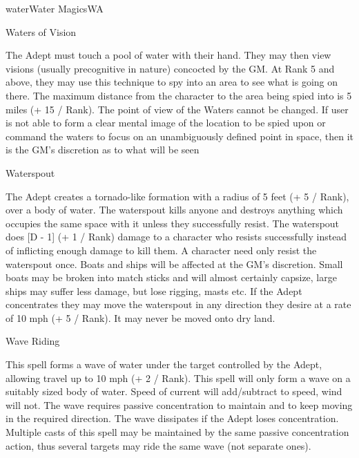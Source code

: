 \begin{college}[1.3]{water}{Water Magics}{WA}
\begin{spell}[S-13]{Waters of Vision}
\begin{effects}
The Adept must touch a pool of water with their hand. They may then
view visions (usually precognitive in nature) concocted by the GM. At
Rank 5 and above, they may use this technique to spy into an area to
see what is going on there. The maximum distance from the character to
the area being spied into is 5 miles (+ 15 / Rank). The point of view of
the Waters cannot be changed. If user is not able to form a clear
mental image of the location to be spied upon or command the waters to
focus on an unambiguously defined point in space, then it is the GM's
discretion as to what will be seen
\end{effects}
\end{spell}

\begin{spell}[S-14]{Waterspout}

\begin{effects}
The Adept creates a tornado-like formation with a radius of 5 feet (+
5 / Rank), over a body of water. The waterspout kills anyone and
destroys anything which occupies the same space with it unless they
successfully resist. The waterspout does [D - 1] (+ 1 / Rank) damage
to a character who resists successfully instead of inflicting enough
damage to kill them. A character need only resist the waterspout
once. Boats and ships will be affected at the GM's discretion. Small
boats may be broken into match sticks and will almost certainly
capsize, large ships may suffer less damage, but lose rigging, masts
etc. If the Adept concentrates they may move the waterspout in any
direction they desire at a rate of 10 mph (+ 5 / Rank). It may never
be moved onto dry land.
\end{effects}
\end{spell}

\begin{spell}[S-15]{Wave Riding}

\begin{effects}
This spell forms a wave of water under the target controlled by the
Adept, allowing travel up to 10 mph (+ 2 / Rank). This spell will only
form a wave on a suitably sized body of water. Speed of current will
add/subtract to speed, wind will not. The wave requires passive
concentration to maintain and to keep moving in the required
direction. The wave dissipates if the Adept loses concentration.
Multiple casts of this spell may be maintained by the same passive
concentration action, thus several targets may ride the same wave (not
separate ones).
\end{effects}
\end{spell}


\end{college}
